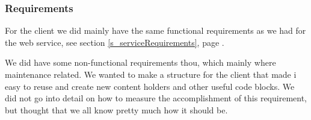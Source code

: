 \subsubsection{Requirements}
For the client we did mainly have the same functional requirements as we had for the web service, see section \ref{s_serviceRequirements}, page \pageref{s_serviceRequirements}.

We did have some non-functional requirements thou, which mainly where maintenance related. We wanted to make a structure for the client that made i easy to reuse and create new content holders and other useful code blocks.
We did not go into detail on how to measure the accomplishment of this requirement, but thought that we all know pretty much how it should be.